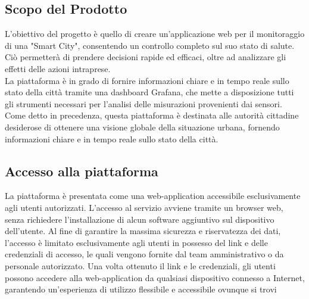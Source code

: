 \subsection{Scopo del Prodotto}
L'obiettivo del progetto è quello di creare un'applicazione web per il monitoraggio di una "Smart City", consentendo un controllo completo sul suo stato di salute. Ciò permetterà di prendere decisioni rapide ed efficaci, oltre ad analizzare gli effetti delle azioni intraprese.\\
La piattaforma è in grado di fornire informazioni chiare e in tempo reale sullo stato della città tramite una dashboard Grafana, che mette a disposizione tutti gli strumenti necessari per l'analisi delle misurazioni provenienti dai sensori. \\
Come detto in precedenza, questa piattaforma è destinata alle autorità cittadine desiderose di ottenere una visione globale della situazione urbana, fornendo informazioni chiare e in tempo reale sullo stato della città.

\subsection{Accesso alla piattaforma}
La piattaforma è presentata come una web-application accessibile esclusivamente agli utenti autorizzati. L'accesso al servizio avviene tramite un browser web, senza richiedere l'installazione di alcun software aggiuntivo sul dispositivo dell'utente. Al fine di garantire la massima sicurezza e riservatezza dei dati, l'accesso è limitato esclusivamente agli utenti in possesso del link e delle credenziali di accesso, le quali vengono fornite dal team amministrativo o da personale autorizzato. Una volta ottenuto il link e le credenziali, gli utenti possono accedere alla web-application da qualsiasi dispositivo connesso a Internet, garantendo un'esperienza di utilizzo flessibile e accessibile ovunque si trovi